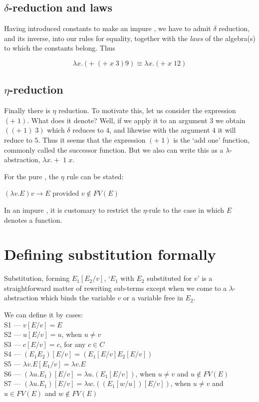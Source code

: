 \subsection{$\delta$-reduction and laws}
Having introduced constants to make an impure \LC, we have to admit
$\delta$ reduction, and its inverse, into our rules for equality,
together with the {\em laws} of the algebra(s) to which the constants
belong. Thus

$$\lambda x. (+\;(+\;x\;3) 9) \equiv \lambda x. (+\;x\;12)$$


\subsection{$\eta$-reduction}

Finally there is $\eta$ reduction. To motivate this, let us consider the
expression $(+\; 1)$. What does it denote?  Well, if we apply it to an
argument $3$ we obtain $((+\; 1)\; 3)$ which $\delta$ reduces to $4$,
and likewise with the argument $4$ it will reduce to $5$.
Thus it seems that the expression $(+\; 1)$ is the `add one' function,
commonly called the successor function. But we also can write this as a
$\lambda$-abstraction, $\lambda x. +\; 1\; x$.

For the pure \LC, the $\eta$ rule can be stated:

$(\lambda v.E)v \longrightarrow E$ provided $v\not\in FV(E)$

In an impure \LC, it is customary to restrict the $\eta$-rule to the case
in which $E$ denotes a function.


\section{Defining substitution formally}

Substitution, forming $E_1[E_2/v]$, `$E_1$ with $E_2$ substituted for $v$'
is a straightforward matter of rewriting sub-terms except when we come to a
$\lambda$-abstraction which binds the variable $v$ or a variable free in
$E_2$.


We can define it by cases:\\
S1 --- $v[E/v] = E$  \\
S2 --- $u[E/v] = u$, when $u\neq v$\\
S3 --- $c[E/v] = c$, for any $c\in C$\\
S4 --- $(E_1E_2)[E/v] =(E_1[E/v]E_2[E/v])$\\
S5 --- $\lambda v. E [E_1/v] = \lambda v. E$\\
S6 --- $(\lambda u. E_1) [E/v] = \lambda u. (E_1 [E/v])$,
when $u\neq v$ and $u\not\in FV(E)$\\
S7 --- $(\lambda u. E_1) [E/v] = \lambda w. ((E_1[w/u]) [E/v])$,
when $u\neq v$ and $u\in FV(E)$ and $w\not\in FV(E)$\\

